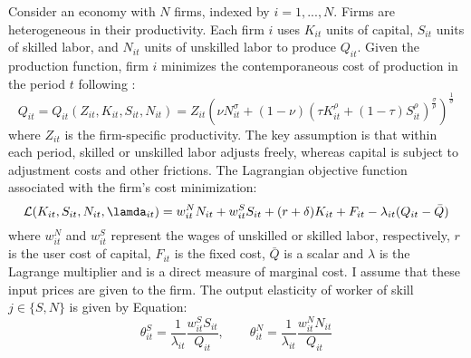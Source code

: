 \documentclass[12pt]{article}
\begin{document}
Consider an economy with $N$ firms, indexed by $i = 1, ..., N$. Firms are heterogeneous in their productivity. Each firm $i$ uses $K_{it}$ units of capital, $S_{it}$ units of skilled labor, and $N_{it}$ units of unskilled labor to produce $Q_{it}$. Given the production function, firm $i$ minimizes the contemporaneous cost of production in the period $t$ following \citet{krusell2000capital}:
\begin{equation}
    Q_{it}=Q_{it}(Z_{it},K_{it},S_{it},N_{it})=Z_{it}\left (\nu N_{it}^{\sigma}+(1-\nu)(\tau K_{it}^{\rho}+(1-\tau)S_{it}^{\rho})^{\frac{\sigma}{\rho}}\right)^{\frac{1}{\sigma}}
\end{equation}
where $Z_{it}$ is the firm-specific productivity. The key assumption is that within each period, skilled or unskilled labor adjusts freely, whereas capital is subject to adjustment costs and other frictions. The Lagrangian objective function associated with the firm’s cost minimization:
\begin{equation}
    \mathcal{L}(K_{it},S_{it},N_{it},\lamda_{it})=w_{it}^{N}N_{it}+w_{it}^{S}S_{it}+(r+\delta)K_{it}+F_{it}-\lambda_{it}(Q_{it}-\bar{Q})
\end{equation}
where $w_{it}^{N}$ and $w_{it}^{S}$ represent the wages of unskilled or skilled labor, respectively, $r$ is the user cost of capital, $F_{it}$ is the fixed cost, $\bar{Q}$ is a scalar and $\lambda$ is the Lagrange multiplier and is a direct measure of marginal cost. I assume that these input prices are given to the firm. The output elasticity of worker of skill $j\in \{S,N\}$ is given by Equation:
\begin{equation}
    \theta^{S}_{it}=\frac{1}{\lambda_{it}}\frac{w^{S}_{it}S_{it}}{Q_{it}},\qquad \theta^{N}_{it}=\frac{1}{\lambda_{it}}\frac{w^{N}_{it}N_{it}}{Q_{it}}
\end{equation}
\end{document}
